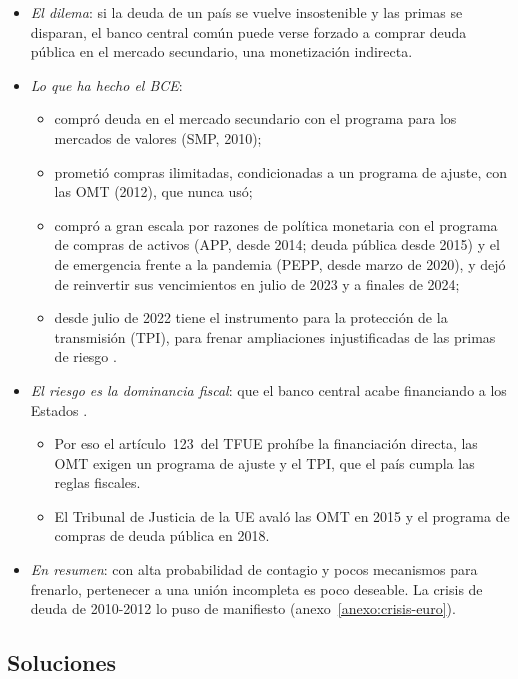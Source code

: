 \documentclass[11pt]{article}
\begin{document}
\begin{itemize}
\item \emph{El dilema}: si la deuda de un país se vuelve insostenible y las primas se disparan, el banco central común puede verse forzado a comprar deuda pública en el mercado secundario, una monetización indirecta.
\item \emph{Lo que ha hecho el BCE}:
  \begin{itemize}
  \item compró deuda en el mercado secundario con el programa para los mercados de valores (SMP, 2010)\nocite{BCE2010SMP};
  \item prometió compras ilimitadas, condicionadas a un programa de ajuste, con las OMT (2012), que nunca usó\nocite{BCE2012OMT};
  \item compró a gran escala por razones de política monetaria con el programa de compras de activos (APP, desde 2014; deuda pública desde 2015) y el de emergencia frente a la pandemia (PEPP, desde marzo de 2020)\nocite{BCE2026APP,BCE2026PEPP}, y dejó de reinvertir sus vencimientos en julio de 2023 y a finales de 2024;
  \item desde julio de 2022 tiene el instrumento para la protección de la transmisión (TPI), para frenar ampliaciones injustificadas de las primas de riesgo\nocite{BCE2022TPI} .
  \end{itemize}
\item \emph{El riesgo es la dominancia fiscal}: que el banco central acabe financiando a los Estados .
  \begin{itemize}
  \item Por eso el artículo~123~del TFUE prohíbe la financiación directa\nocite{TFUE2016}, las OMT exigen un programa de ajuste y el TPI, que el país cumpla las reglas fiscales.
  \item El Tribunal de Justicia de la UE avaló las OMT en 2015\nocite{TJUE2015Gauweiler} y el programa de compras de deuda pública en 2018\nocite{TJUE2018Weiss}.
  \end{itemize}
\item \emph{En resumen}: con alta probabilidad de contagio y pocos mecanismos para frenarlo, pertenecer a una unión incompleta es poco deseable. La crisis de deuda de 2010-2012 lo puso de manifiesto (anexo~\ref{anexo:crisis-euro}).
\end{itemize}

\subsection{Soluciones}\label{sec:soluciones}
\end{document}

